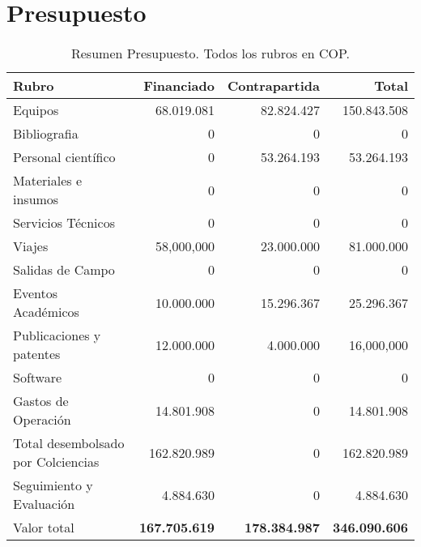 
\section{Presupuesto}

\begin{table}[!h]
\begin{center}
\begin{tabular}{|l|r|r|r|}\hline
\textbf{Rubro} 	& {\bf Financiado} & {\bf Contrapartida} & {\bf Total}\\\hline 
Equipos	& 68.019.081 &	82.824.427 &	150.843.508\\\hline
Bibliografia	&0	&0	&0 \\\hline
Personal científico	&0	&53.264.193	&53.264.193\\\hline
Materiales e insumos	&0	&0	&0\\\hline
Servicios Técnicos	&0	&0	&0\\\hline
Viajes	&58,000,000	&23.000.000	&81.000.000\\\hline
Salidas de Campo	&0	&0	&0\\\hline
Eventos Académicos	&10.000.000	&15.296.367	&25.296.367\\\hline
Publicaciones y patentes&	12.000.000	&4.000.000	&16,000,000\\\hline
Software&	0	&0	&0\\\hline
Gastos de Operación&	14.801.908	&0	&14.801.908\\\hline
Total desembolsado por Colciencias&	162.820.989	&0	&162.820.989\\\hline
Seguimiento y Evaluación&	 4.884.630	&0	&4.884.630\\\hline
Valor total&	{\bf 167.705.619}	& {\bf 178.384.987}	&{\bf 346.090.606}\\\hline

\end{tabular} 
\caption{Resumen Presupuesto. Todos los rubros en COP.}
\end{center}
\label{Resumen Presupuesto}
\end{table}


